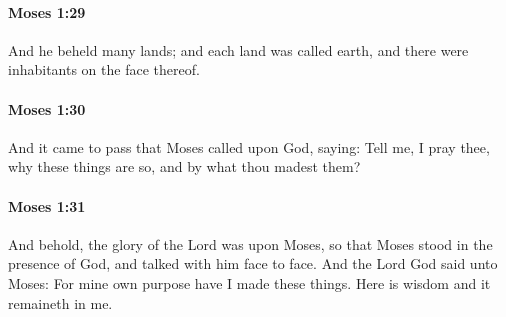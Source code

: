 		\paragraph{Moses 1:29} %
			\label{MOSES-1-29}

			And he beheld many lands; and each land was called earth, and there were inhabitants on the face thereof.


		\paragraph{Moses 1:30} %
			\label{MOSES-1-30}

			And it came to pass that Moses called upon God, saying: Tell me, I pray thee, why these things are so, and by what thou madest them?


		\paragraph{Moses 1:31} %
			\label{MOSES-1-31}

			And behold, the glory of the Lord was upon Moses, so that Moses stood in the presence of God, and talked with him face to face. And the Lord God said unto Moses: For mine own purpose have I made these things. Here is wisdom and it remaineth in me.


